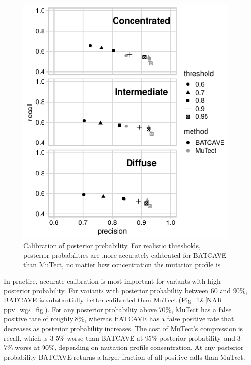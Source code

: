 \documentclass[a4,center,fleqn]{NAR}
\newcommand{\batcave}{BATCAVE }
\begin{document}
\begin{figure}
  \begin{center}
  \includegraphics{figures/ppv_wes.pdf}
  \end{center}
  \caption{Calibration of posterior probability. 
  For realistic thresholds, posterior probabilities are more accurately calibrated for \batcave than MuTect, no matter how concentration the mutation profile is.}
\label{NAR-ppv_fig}
\end{figure}

In practice, accurate calibration is most important for variants with high posterior probability.
For variants with posterior probability between 60 and 90\%, \batcave is substantially better calibrated than MuTect (Fig.~\ref{NAR-ppv_fig}\&\ref{NAR-ppv_wgs_fig}).
For any posterior probability above 70\%, MuTect has a false positive rate of roughly 8\%, whereas \batcave has a false positive rate that decreases as posterior probability increases.
The cost of MuTect's compression is recall, which is 3-5\% worse than \batcave at 95\% posterior probability, and 3-7\% worse at 90\%, depending on mutation profile concentration.
At any posterior probability \batcave returns a larger fraction of all positive calls than MuTect.
\end{document}
